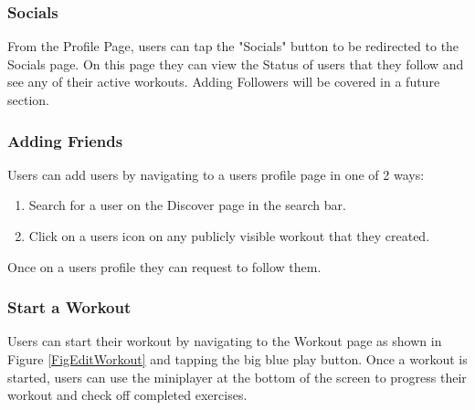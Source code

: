 \documentclass{article}
\begin{document}
\subsubsection{Socials}

From the Profile Page, users can tap the "Socials" button to be redirected to the Socials page. On this page they can view the Status of users that they follow and see any of their active workouts. Adding Followers will be covered in a future section.
    
\subsubsection{Adding Friends}

Users can add users by navigating to a users profile page in one of 2 ways:\\
\begin{enumerate}
    \item Search for a user on the Discover page in the search bar.
    \item Click on a users icon on any publicly visible workout that they created.
\end{enumerate}
Once on a users profile they can request to follow them.\\

\subsubsection{Start a Workout}

Users can start their workout by navigating to the Workout page as shown in Figure \ref{FigEditWorkout} and tapping the big blue play button. Once a workout is started, users can use the miniplayer at the bottom of the screen to progress their workout and check off completed exercises.
\end{document}
